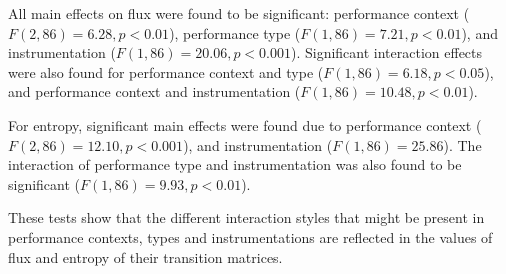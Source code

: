\documentclass{sigchi}
\begin{document}
All main effects on flux were found to be significant: performance
context ($F(2,86) = 6.28, p < 0.01$), performance type
($F(1,86) = 7.21, p < 0.01$), and instrumentation
($F(1,86) = 20.06, p < 0.001$). Significant interaction effects were
also found for performance context and type
($F(1,86) = 6.18, p < 0.05$), and performance context and
instrumentation ($F(1,86) = 10.48, p < 0.01$).

For entropy, significant main effects were found due to performance
context ($F(2,86) = 12.10, p < 0.001$), and instrumentation
($F(1,86) = 25.86$). The interaction of performance type and
instrumentation was also found to be significant
($F(1,86) = 9.93, p<0.01$).

These tests show that the different interaction styles that might be
present in performance contexts, types and instrumentations are
reflected in the values of flux and entropy of their transition
matrices.
\end{document}
